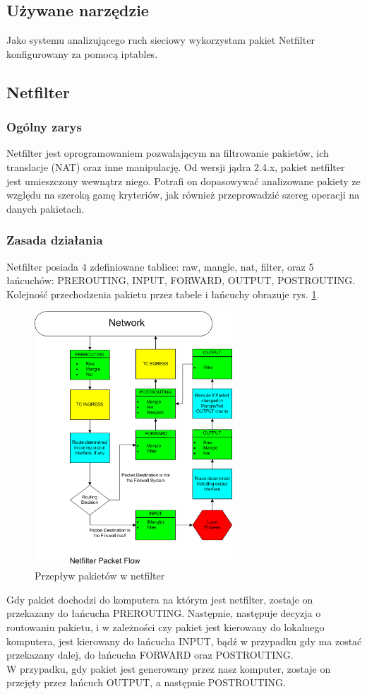 \documentclass[a4paper,12pt]{book}
\begin{document}
		\subsection{Używane narzędzie}
			Jako systemu analizującego ruch sieciowy wykorzystam pakiet Netfilter konfigurowany za pomocą iptables.
		\subsection{Netfilter}
			\subsubsection{Ogólny zarys}
				Netfilter jest oprogramowaniem pozwalającym na filtrowanie pakietów, ich translacje (NAT) oraz inne manipulację.
				Od wersji jądra 2.4.x, pakiet netfilter jest umieszczony wewnątrz niego.
				Potrafi on dopasowywać analizowane pakiety ze względu na szeroką gamę kryteriów, jak również przeprowadzić szereg operacji na danych pakietach.
			\subsubsection{Zasada działania}
				Netfilter posiada 4 zdefiniowane tablice: raw, mangle, nat, filter, oraz 5 łańcuchów: PREROUTING, INPUT, FORWARD, OUTPUT, POSTROUTING.
				Kolejność przechodzenia pakietu przez tabele i łańcuchy obrazuje rys. \ref{fig:flowchart}.\\
				\begin{figure}[h]
					\centering
						\includegraphics[width=280px]{Netfilter.png}
						\caption{Przepływ pakietów w netfilter}
						\label{fig:flowchart}
				\end{figure}
				Gdy pakiet dochodzi do komputera na którym jest netfilter, zostaje on przekazany do łańcucha PREROUTING. Następnie, następuje decyzja o routowaniu pakietu, i w zależności czy pakiet jest kierowany do lokalnego komputera, jest kierowany do łańcucha INPUT, bądź w przypadku gdy ma zostać przekazany dalej, do łańcucha FORWARD oraz POSTROUTING.\\
				W przypadku, gdy pakiet jest generowany przez nasz komputer, zostaje on przejęty przez łańcuch OUTPUT, a następnie POSTROUTING.
\end{document}
